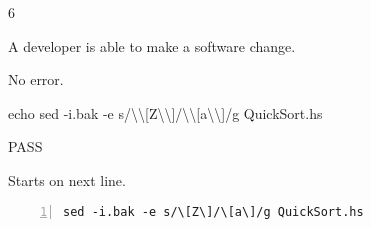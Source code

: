 \begin{description}[align=right,leftmargin=3.2cm,labelindent=3.0cm]
\item[Step:] 6
\item[Confirm:] A developer is able to make a software change.
\item[Expectation:] No error.
\item[Command:] echo sed  -i.bak -e s/\textbackslash\textbackslash[Z\textbackslash\textbackslash]/\textbackslash\textbackslash[a\textbackslash\textbackslash]/g QuickSort.hs
\item[Test Result:] PASS
\item[Evidence:] Starts on next line.
\end{description}
\begin{lstlisting}[numbers=left]
sed -i.bak -e s/\[Z\]/\[a\]/g QuickSort.hs

\end{lstlisting}
